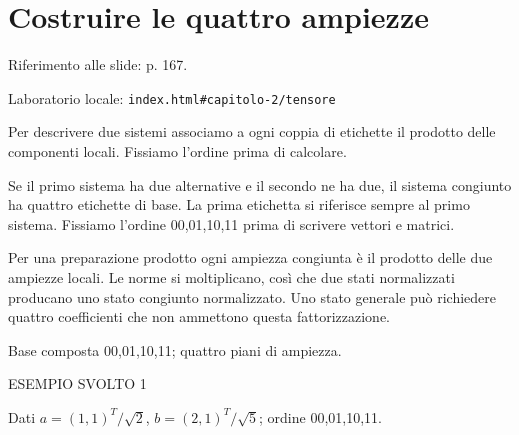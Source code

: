 
\Needspace{.43\textheight}
\section{Costruire le quattro ampiezze}
\label{c2-tensore}

{\sffamily\small\color{Ink!70} Riferimento alle slide: p. 167.\par}

{\sffamily\small\color{Ink!70} Laboratorio locale: \nolinkurl{index.html#capitolo-2/tensore}\par}

Per descrivere due sistemi associamo a ogni coppia di etichette il prodotto delle componenti locali. Fissiamo l'ordine prima di calcolare.\par

Se il primo sistema ha due alternative e il secondo ne ha due, il sistema congiunto ha quattro etichette di base. La prima etichetta si riferisce sempre al primo sistema. Fissiamo l'ordine 00,01,10,11 prima di scrivere vettori e matrici.\par

Per una preparazione prodotto ogni ampiezza congiunta è il prodotto delle due ampiezze locali. Le norme si moltiplicano, così che due stati normalizzati producano uno stato congiunto normalizzato. Uno stato generale può richiedere quattro coefficienti che non ammettono questa fattorizzazione.\par



Base composta 00,01,10,11; quattro piani di ampiezza.\par


\Needspace{.36\textheight}\label{c2-tensore-example-1}
{\sffamily\small\color{Accent} ESEMPIO SVOLTO 1\par}
Dati \(a=(1{,}1)^{T}/\sqrt{2}\), \(b=(2{,}1)^{T}/\sqrt{5}\); ordine 00,01,10,11.\par


